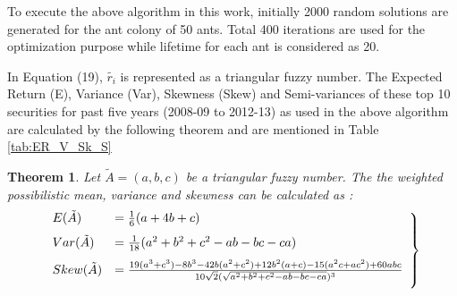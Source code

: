 \documentclass{elsarticle}
\begin{document}
To execute the above algorithm in this work, initially 2000 random solutions are generated for the ant colony of 50 ants. Total 400 iterations are used for the optimization purpose while lifetime for each ant is considered as 20. 

In Equation (19), $\tilde{r_i}$ is represented as a triangular fuzzy number. The Expected Return (E), Variance (Var), Skewness (Skew) and Semi-variances of these top 10 securities for past five years (2008-09 to 2012-13) as used in the above algorithm are calculated by the following theorem and are mentioned in Table \ref{tab:ER_V_Sk_S} 
\newtheorem{theorem}{Theorem}[section]
\begin{theorem}
Let $\tilde{A}=(a,b,c)$ be a triangular fuzzy number. The  the weighted possibilistic mean, variance and skewness can be calculated as \cite{Bhattacharyya2013}:
\begin{equation}
\begin{aligned}
\left. \begin{array}{ll}
\vspace{0.25cm}
E(\tilde{A})&=\frac{1}{6}(a+4b+c)\\
\vspace{0.25cm}
Var(\tilde{A})&=\frac{1}{18}(a^2+b^2+c^2-ab-bc-ca)\\
\vspace{0.25cm}
Skew(\tilde{A})&=\frac{19(a^3+c^3)-8b^3-42b(a^2+c^2)+12b^2(a+c)-15(a^2c+ac^2)+60abc}{10\sqrt{2}(\sqrt{a^2+b^2+c^2-ab-bc-ca})^3}
\end{array}\right\}
\end {aligned}
\end{equation}
\end{theorem}  
\end{document}
